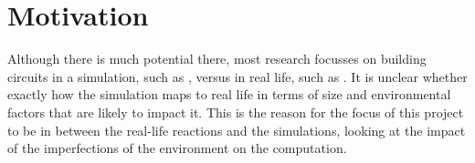 \section{Motivation}
Although there is much potential there, most research focusses on building circuits in a simulation, such as \cite{StovoldJames2019RaGI}, versus in real life, such as \cite{gorecki2003chemical}. It is unclear whether exactly how the simulation maps to real life in terms of size and environmental factors that are likely to impact it. 
This is the reason for the focus of this project to be in between the real-life reactions and the simulations, looking at the impact of the imperfections of the environment on the computation.
